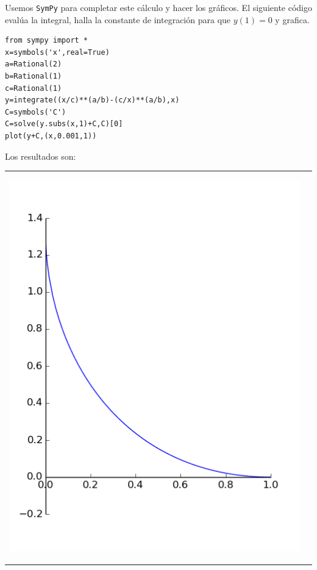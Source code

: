 \documentclass{article}
\begin{document}
Usemos \texttt{SymPy} para completar este cálculo y hacer los gráficos. El siguiente código evalúa la integral, halla la constante de integración para que $y(1)=0$ y grafica.

\begin{lstlisting}
from sympy import *
x=symbols('x',real=True)
a=Rational(2)
b=Rational(1)
c=Rational(1)
y=integrate((x/c)**(a/b)-(c/x)**(a/b),x)
C=symbols('C')
C=solve(y.subs(x,1)+C,C)[0]
plot(y+C,(x,0.001,1))
\end{lstlisting}

Los resultados son:

\begin{tabular}{m{5cm} m{5cm}}
\begin{center}
\includegraphics[scale=.3]{imagenes/perse_a_1_b_2.png}


\end{center}
\end{tabular}
\end{document}
